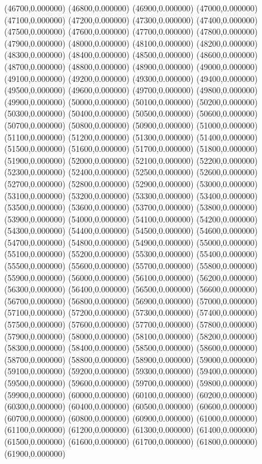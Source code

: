 (46700,0.000000)
(46800,0.000000)
(46900,0.000000)
(47000,0.000000)
(47100,0.000000)
(47200,0.000000)
(47300,0.000000)
(47400,0.000000)
(47500,0.000000)
(47600,0.000000)
(47700,0.000000)
(47800,0.000000)
(47900,0.000000)
(48000,0.000000)
(48100,0.000000)
(48200,0.000000)
(48300,0.000000)
(48400,0.000000)
(48500,0.000000)
(48600,0.000000)
(48700,0.000000)
(48800,0.000000)
(48900,0.000000)
(49000,0.000000)
(49100,0.000000)
(49200,0.000000)
(49300,0.000000)
(49400,0.000000)
(49500,0.000000)
(49600,0.000000)
(49700,0.000000)
(49800,0.000000)
(49900,0.000000)
(50000,0.000000)
(50100,0.000000)
(50200,0.000000)
(50300,0.000000)
(50400,0.000000)
(50500,0.000000)
(50600,0.000000)
(50700,0.000000)
(50800,0.000000)
(50900,0.000000)
(51000,0.000000)
(51100,0.000000)
(51200,0.000000)
(51300,0.000000)
(51400,0.000000)
(51500,0.000000)
(51600,0.000000)
(51700,0.000000)
(51800,0.000000)
(51900,0.000000)
(52000,0.000000)
(52100,0.000000)
(52200,0.000000)
(52300,0.000000)
(52400,0.000000)
(52500,0.000000)
(52600,0.000000)
(52700,0.000000)
(52800,0.000000)
(52900,0.000000)
(53000,0.000000)
(53100,0.000000)
(53200,0.000000)
(53300,0.000000)
(53400,0.000000)
(53500,0.000000)
(53600,0.000000)
(53700,0.000000)
(53800,0.000000)
(53900,0.000000)
(54000,0.000000)
(54100,0.000000)
(54200,0.000000)
(54300,0.000000)
(54400,0.000000)
(54500,0.000000)
(54600,0.000000)
(54700,0.000000)
(54800,0.000000)
(54900,0.000000)
(55000,0.000000)
(55100,0.000000)
(55200,0.000000)
(55300,0.000000)
(55400,0.000000)
(55500,0.000000)
(55600,0.000000)
(55700,0.000000)
(55800,0.000000)
(55900,0.000000)
(56000,0.000000)
(56100,0.000000)
(56200,0.000000)
(56300,0.000000)
(56400,0.000000)
(56500,0.000000)
(56600,0.000000)
(56700,0.000000)
(56800,0.000000)
(56900,0.000000)
(57000,0.000000)
(57100,0.000000)
(57200,0.000000)
(57300,0.000000)
(57400,0.000000)
(57500,0.000000)
(57600,0.000000)
(57700,0.000000)
(57800,0.000000)
(57900,0.000000)
(58000,0.000000)
(58100,0.000000)
(58200,0.000000)
(58300,0.000000)
(58400,0.000000)
(58500,0.000000)
(58600,0.000000)
(58700,0.000000)
(58800,0.000000)
(58900,0.000000)
(59000,0.000000)
(59100,0.000000)
(59200,0.000000)
(59300,0.000000)
(59400,0.000000)
(59500,0.000000)
(59600,0.000000)
(59700,0.000000)
(59800,0.000000)
(59900,0.000000)
(60000,0.000000)
(60100,0.000000)
(60200,0.000000)
(60300,0.000000)
(60400,0.000000)
(60500,0.000000)
(60600,0.000000)
(60700,0.000000)
(60800,0.000000)
(60900,0.000000)
(61000,0.000000)
(61100,0.000000)
(61200,0.000000)
(61300,0.000000)
(61400,0.000000)
(61500,0.000000)
(61600,0.000000)
(61700,0.000000)
(61800,0.000000)
(61900,0.000000)
